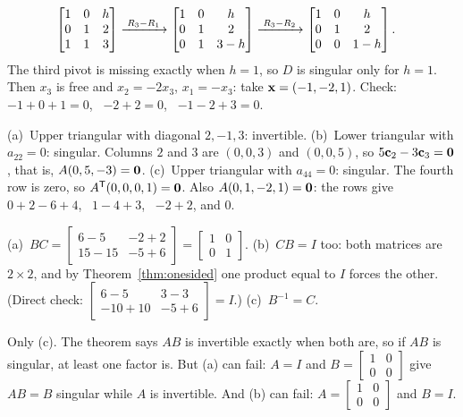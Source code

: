 \documentclass[11pt]{article}
\begin{document}
\begin{description}[leftmargin=0pt,itemsep=5pt]
  \begin{align*}
  \begin{bmatrix}1&0&h\\0&1&2\\1&1&3\end{bmatrix}
  &\xrightarrow{\;R_3-R_1\;}
  \begin{bmatrix}1&0&h\\0&1&2\\0&1&3-h\end{bmatrix}
  \xrightarrow{\;R_3-R_2\;}
  \begin{bmatrix}1&0&h\\0&1&2\\0&0&1-h\end{bmatrix}.
  \end{align*}
  The third pivot is missing exactly when $h=1$, so $D$ is singular only for $h=1$. Then $x_3$ is free and $x_2=-2x_3$, $x_1=-x_3$: take $\mathbf{x}=(-1,-2,1)$. Check: $-1+0+1=0$, \ $-2+2=0$, \ $-1-2+3=0$.
  \item[Knowledge Check \ref{kc:triangular}.] (a)~Upper triangular with diagonal $2,-1,3$: invertible. (b)~Lower triangular with $a_{22}=0$: singular. Columns $2$ and $3$ are $(0,0,3)$ and $(0,0,5)$, so $5\mathbf{c}_2-3\mathbf{c}_3=\mathbf{0}$, that is, $A(0,5,-3)=\mathbf{0}$. (c)~Upper triangular with $a_{44}=0$: singular. The fourth row is zero, so $A^{\mathsf T}(0,0,0,1)=\mathbf{0}$. Also $A(0,1,-2,1)=\mathbf{0}$: the rows give $0+2-6+4$, \ $1-4+3$, \ $-2+2$, and $0$.
  \item[Knowledge Check \ref{kc:onesided}.] (a)~$BC=\begin{bmatrix}6-5&-2+2\\15-15&-5+6\end{bmatrix}=\begin{bmatrix}1&0\\0&1\end{bmatrix}$. (b)~$CB=I$ too: both matrices are $2\times2$, and by Theorem~\ref{thm:onesided} one product equal to $I$ forces the other. (Direct check: $\begin{bmatrix}6-5&3-3\\-10+10&-5+6\end{bmatrix}=I$.) (c)~$B^{-1}=C$.
  \item[Knowledge Check \ref{kc:singprod}.] Only (c). The theorem says $AB$ is invertible exactly when both are, so if $AB$ is singular, at least one factor is. But (a) can fail: $A=I$ and $B=\begin{bmatrix}1&0\\0&0\end{bmatrix}$ give $AB=B$ singular while $A$ is invertible. And (b) can fail: $A=\begin{bmatrix}1&0\\0&0\end{bmatrix}$ and $B=I$.

\end{description}
\end{document}
